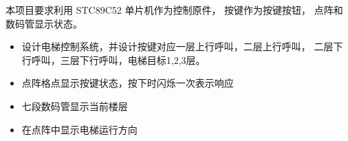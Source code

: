 \documentclass[../main.tex]{subfiles} %
\begin{document}
本项目要求利用 STC89C52 单片机作为控制原件，
按键作为按键按钮，
点阵和数码管显示状态。

\begin{itemize}
  \item 设计电梯控制系统，并设计按键对应一层上行呼叫，二层上行呼叫，
    二层下行呼叫，三层下行呼叫，电梯目标1,2,3层。
  \item 点阵格点显示按键状态，按下时闪烁一次表示响应
  \item 七段数码管显示当前楼层
  \item 在点阵中显示电梯运行方向
\end{itemize}
\end{document}

